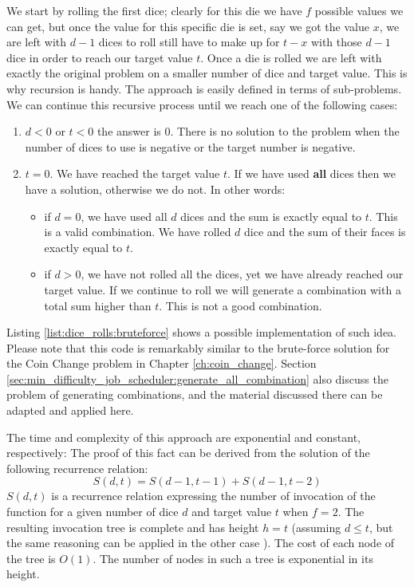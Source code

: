 We start by rolling the first dice; clearly for this die we have $f$ possible values we can get,
but once the value for this specific die is set, say we got the value $x$,
we are left with $d-1$ dices to roll still have to make up for $t-x$ with those $d-1$ dice in order to reach our target value $t$.
Once a die is rolled we are left with exactly the original problem on a smaller number of dice and target value.
This is why recursion is handy. The approach is easily defined in terms of sub-problems.
We can continue this recursive process until we reach one of the following cases:
\begin{enumerate}
	\item $d<0$ or $t<0$ the answer is $0$. There is no solution to the problem when the number of dices to use is negative or the target number is negative.
	\item $t=0$. We have reached the target value $t$. If we have used \textbf{all} dices then we have a solution, otherwise we do not. In other words:
	\begin{itemize}
		\item if $d=0$, we have used all $d$ dices and the sum is exactly equal to $t$. This is a valid combination. We have rolled $d$ dice and the sum of their faces is exactly equal to $t$.
		\item if $d>0$, we have not rolled all the dices, yet we have already reached our target value. If we continue to roll we will generate a combination with a total sum higher than $t$. This is not a good combination.
	\end{itemize}
\end{enumerate}


Listing \ref{list:dice_rolls:bruteforce} shows a possible implementation of such idea.
Please note that this code is remarkably similar to the brute-force solution for the Coin Change problem in Chapter \ref{ch:coin_change}. Section \ref{sec:min_difficulty_job_scheduler:generate_all_combination}
also discuss the problem of generating combinations, and the material discussed there can be adapted and applied here.


The time and  complexity of this approach are exponential and constant, respectively: 
The proof of this fact can be derived from the solution of the following recurrence relation:
\begin{equation}
	S(d,t) = S(d-1,t-1) + S(d-1,t-2)
\label{eq:dice_rolls:dpformula}
\end{equation}
$S(d,t)$ is a recurrence relation expressing the number of invocation of the function 
for a given number of dice $d$ and target value $t$ when $f=2$.
The resulting invocation tree is complete and has height $h=t$ (assuming $d \leq t$, but the same reasoning can be applied in the other case ). 
The cost of each node of the tree is $O(1)$.
The number of nodes in such a tree is exponential in its height. 

